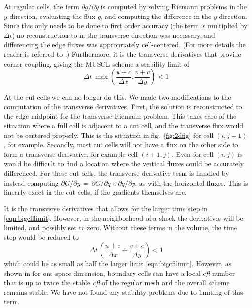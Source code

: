 At regular cells, the term $\partial g / \partial y$ is computed by solving Riemann
problems in the $y$ direction,  evaluating the flux $g$, and computing the
difference in the $y$ direction.
Since this only needs to be done to first order accuracy (the term is multiplied
by $\Delta t$)  no reconstruction to in the transverse direction was necessary,
and differencing the edge fluxes was appropriately cell-centered.
(For more details the reader is referred to \cite{Colella:Unsplit}.)
Furthermore, it is the transverse derivatives that provide corner coupling,
giving the MUSCL scheme a stability limit of
\begin{equation}
\label{eqn:bigcfllimit}
\Delta t \, \max \left (\frac{u+c}{\Delta x} , \frac{v+c}{\Delta y} \right) < 1
\end{equation}

At the cut cells we can no longer do this.  We made two modifications to the
computation of the transverse derivatives. First,
the solution is reconstructed to the edge midpoint  for the transverse Riemann problem.
This takes care of the situation where a full cell is adjacent to a cut cell, and
the transverse flux would not be centered properly. This is the situation
in fig.~\ref{fig:2dfig} for cell $(i,j-1)$, for example.
Secondly, most cut cells will not have a flux on the other side to form a
transverse derivative, for example cell $(i+1,j)$. Even for cell $(i,j)$ is would
be difficult to find a location where the vertical fluxes could be accurately differenced.
For these cut cells, the transverse derivative term is handled by instead computing
$ \partial G / \partial y \, = \,  \partial G / \partial q \times \partial q / \partial y$,
as with the horizontal fluxes. This is linearly exact in the cut cells, 
if the gradients themselves are.

It is the transverse derivatives that allows for the larger time step in
\eqref{eqn:bigcfllimit}.
However, in the neighborhood of a shock the derivatives will be limited, and
possibly set to zero.
Without these terms in the volume, the time step would be reduced to 
\begin{equation}
\Delta t \, \left (\frac{u+c}{\Delta x} + \frac{v+c}{\Delta y} \right) < 1
\end{equation}
which could be as small as half the larger limit \eqref{eqn:bigcfllimit}.
However, as shown in \cite{mjb:stability2} for one space dimension, 
boundary cells can have
a local {\em cfl} number that is up to twice the stable {\em cfl} of the regular
mesh and the overall scheme remains stable.  We have not found any stability
problems due to limiting of this term.  


